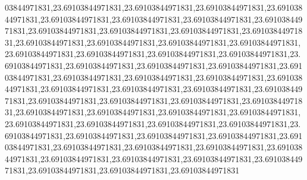03844971831,23.69103844971831,23.69103844971831,23.69103844971831,23.69103844971831,23.69103844971831,23.69103844971831,23.69103844971831,23.69103844971831,23.69103844971831,23.69103844971831,23.69103844971831,23.69103844971831,23.69103844971831,23.69103844971831,23.69103844971831,23.69103844971831,23.69103844971831,23.69103844971831,23.69103844971831,23.69103844971831,23.69103844971831,23.69103844971831,23.69103844971831,23.69103844971831,23.69103844971831,23.69103844971831,23.69103844971831,23.69103844971831,23.69103844971831,23.69103844971831,23.69103844971831,23.69103844971831,23.69103844971831,23.69103844971831,23.69103844971831,23.69103844971831,23.69103844971831,23.69103844971831,23.69103844971831,23.69103844971831,23.69103844971831,23.69103844971831,23.69103844971831,23.69103844971831,23.69103844971831,23.69103844971831,23.69103844971831,23.69103844971831,23.69103844971831,23.69103844971831,23.69103844971831,23.69103844971831,23.69103844971831,23.69103844971831,23.69103844971831,23.69103844971831,23.69103844971831,23.69103844971831,23.69103844971831,23.69103844971831,23.69103844971831
